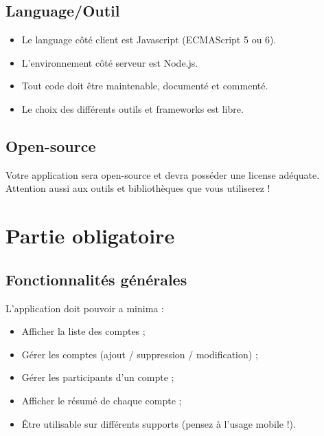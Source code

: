 \documentclass{42-fr}
\begin{document}
    \section{Language/Outil}
        \begin{itemize}\itemsep1pt
            \item Le language c\^ot\'e client est Javascript (ECMAScript 5 ou 6).
            \item L'environnement c\^ot\'e serveur est Node.js.
            \item Tout code doit \^etre maintenable, document\'e et comment\'e.
            \item Le choix des diff\'erents outils et frameworks est libre.
        \end{itemize}


	\section{Open-source}
		Votre application sera open-source et devra poss\'eder une license ad\'equate.
		Attention aussi aux outils et biblioth\`eques que vous utiliserez !



\chapter{Partie obligatoire}


    \section{Fonctionnalit\'es g\'en\'erales}

        L'application doit pouvoir a minima :\\

        \begin{itemize}\itemsep1pt
            \item Afficher la liste des comptes ;
			\item G\'erer les comptes (ajout / suppression / modification) ;
            \item G\'erer les participants d'un compte ;
			\item Afficher le r\'esum\'e de chaque compte ;
			\item \^Etre utilisable sur diff\'erents supports (pensez \`a l'usage mobile !).
        \end{itemize}
\end{document}
